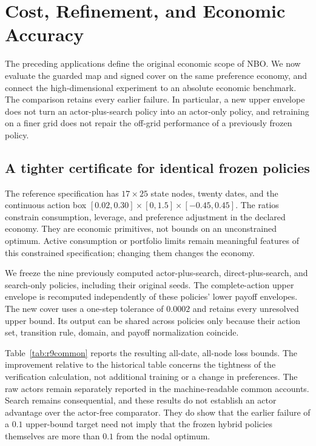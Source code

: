 \section{Cost, Refinement, and Economic Accuracy}\label{sec:r9results}
The preceding applications define the original economic scope of NBO. We now evaluate the guarded map and signed cover on the same preference economy, and connect the high-dimensional experiment to an absolute economic benchmark. The comparison retains every earlier failure. In particular, a new upper envelope does not turn an actor-plus-search policy into an actor-only policy, and retraining on a finer grid does not repair the off-grid performance of a previously frozen policy.

\subsection{A tighter certificate for identical frozen policies}
The reference specification has $17\times25$ state nodes, twenty dates, and the continuous action box $[0.02,0.30]\times[0,1.5]\times[-0.45,0.45]$. The ratios constrain consumption, leverage, and preference adjustment in the declared economy. They are economic primitives, not bounds on an unconstrained optimum. Active consumption or portfolio limits remain meaningful features of this constrained specification; changing them changes the economy.

We freeze the nine previously computed actor-plus-search, direct-plus-search, and search-only policies, including their original seeds. The complete-action upper envelope is recomputed independently of these policies' lower payoff envelopes. The new cover uses a one-step tolerance of $0.0002$ and retains every unresolved upper bound. Its output can be shared across policies only because their action set, transition rule, domain, and payoff normalization coincide.

Table~\ref{tab:r9common} reports the resulting all-date, all-node loss bounds. The improvement relative to the historical table concerns the tightness of the verification calculation, not additional training or a change in preferences. The raw actors remain separately reported in the machine-readable common accounts. Search remains consequential, and these results do not establish an actor advantage over the actor-free comparator. They do show that the earlier failure of a $0.1$ upper-bound target need not imply that the frozen hybrid policies themselves are more than $0.1$ from the nodal optimum.

